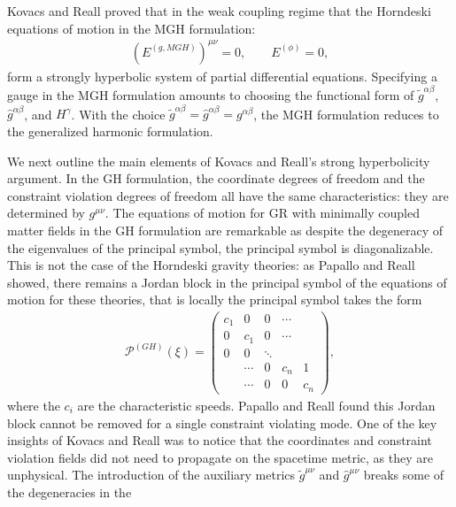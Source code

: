 \documentclass{ws-ijmpd}
\begin{document}
Kovacs and Reall proved that in the weak coupling regime that the
Horndeski equations of motion in the MGH formulation:
\begin{align}
   \left(E^{(g,MGH)}\right)^{\mu\nu}
   = 0
   ,\qquad
   E^{(\phi)}
   =
   0
   ,
\end{align}
form a strongly hyperbolic system of 
partial differential equations\cite{Kovacs:2020pns,Kovacs:2020ywu}.
Specifying a gauge in the MGH formulation amounts to choosing the
functional form of  
$\tilde{g}^{\alpha\beta}$, 
$\hat{g}^{\alpha\beta}$, and $H^{\gamma}$.
With the choice
$\tilde{g}^{\alpha\beta}
=\hat{g}^{\alpha\beta}
=g^{\alpha\beta}$, the MGH 
formulation reduces to the generalized harmonic formulation.

We next outline the main elements of Kovacs and Reall's
strong hyperbolicity argument. 
In the GH formulation, 
the coordinate degrees of freedom and the constraint violation
degrees of freedom all have the same characteristics:
they are determined by $g^{\mu\nu}$.
The equations of motion for GR with minimally coupled matter fields 
in the GH formulation are remarkable 
as despite the degeneracy of the eigenvalues of the principal symbol,
the principal symbol is diagonalizable.
This is not the case of the Horndeski gravity theories: as
Papallo and Reall showed\cite{Papallo:2017qvl,Papallo:2017ddx},
there remains a Jordan block in the principal symbol of the
equations of motion for these theories, that is locally
the principal symbol takes the form
\begin{align}
   \mathcal{P}^{(GH)}\left(\xi\right)
   =
   \begin{pmatrix}
      c_1 & 0      & 0      & \cdots   \\
      0   & c_1    & 0      & \cdots   \\
      0   & 0      & \ddots            \\
          & \cdots & 0      & c_n & 1  \\
          & \cdots & 0      & 0   & c_n
   \end{pmatrix}
   ,
\end{align}
where the $c_i$ are the characteristic speeds. 
Papallo and Reall found this Jordan block cannot
be removed for a single constraint violating mode.
One of the key insights of Kovacs and Reall was to notice that the
coordinates and constraint violation fields did not
need to propagate on the spacetime metric, 
as they are unphysical.
The introduction of the auxiliary metrics $\tilde{g}^{\mu\nu}$
and $\hat{g}^{\mu\nu}$ breaks some of the degeneracies in the
\end{document}
